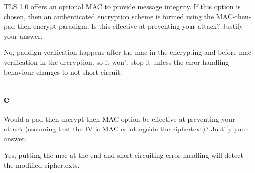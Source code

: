 \documentclass[11pt]{article}
\begin{document}
TLS 1.0 offers an optional MAC to provide message integrity. If this option is chosen, then an authenticated encryption scheme is formed using the MAC-then-pad-then-encrypt paradigm. Is this effective at preventing your attack? Justify your answer.

No, paddign verification happens after the mac in the encrypting and before mac verification in the decryption, so it won't stop it unless the error handling behaviour changes to not short circuit.

\subsection{e}

Would a pad-then-encrypt-then-MAC option be effective at preventing your attack (assuming that the IV is MAC-ed alongside the ciphertext)? Justify your answer.

Yes, putting the mac at the end and short circuiting error handling will detect the modified ciphertexts. 
\end{document}
